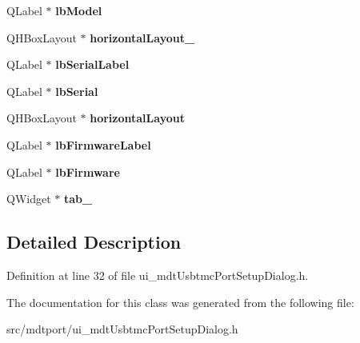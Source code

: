 \begin{DoxyCompactItemize}
\item 
\hypertarget{class_ui__mdt_usbtmc_port_setup_dialog_a4b232d8ec48cc104fc4d2eaaad355eaf}{
QLabel $\ast$ {\bfseries lbModel}}
\label{class_ui__mdt_usbtmc_port_setup_dialog_a4b232d8ec48cc104fc4d2eaaad355eaf}

\item 
\hypertarget{class_ui__mdt_usbtmc_port_setup_dialog_a1c30ffa4feabde91713d7a8c7a053fbc}{
QHBoxLayout $\ast$ {\bfseries horizontalLayout\_}}
\label{class_ui__mdt_usbtmc_port_setup_dialog_a1c30ffa4feabde91713d7a8c7a053fbc}

\item 
\hypertarget{class_ui__mdt_usbtmc_port_setup_dialog_a68f9749fc3e70be2ba7a965da14f067f}{
QLabel $\ast$ {\bfseries lbSerialLabel}}
\label{class_ui__mdt_usbtmc_port_setup_dialog_a68f9749fc3e70be2ba7a965da14f067f}

\item 
\hypertarget{class_ui__mdt_usbtmc_port_setup_dialog_ad899cb06224711efc6720c7a8126b1a3}{
QLabel $\ast$ {\bfseries lbSerial}}
\label{class_ui__mdt_usbtmc_port_setup_dialog_ad899cb06224711efc6720c7a8126b1a3}

\item 
\hypertarget{class_ui__mdt_usbtmc_port_setup_dialog_a1380888929c980b6af834911e1487cfc}{
QHBoxLayout $\ast$ {\bfseries horizontalLayout}}
\label{class_ui__mdt_usbtmc_port_setup_dialog_a1380888929c980b6af834911e1487cfc}

\item 
\hypertarget{class_ui__mdt_usbtmc_port_setup_dialog_afd0b324f810d7f248665ebf3974f4709}{
QLabel $\ast$ {\bfseries lbFirmwareLabel}}
\label{class_ui__mdt_usbtmc_port_setup_dialog_afd0b324f810d7f248665ebf3974f4709}

\item 
\hypertarget{class_ui__mdt_usbtmc_port_setup_dialog_a37252f1a39f7da58e5dcf12c34c5150b}{
QLabel $\ast$ {\bfseries lbFirmware}}
\label{class_ui__mdt_usbtmc_port_setup_dialog_a37252f1a39f7da58e5dcf12c34c5150b}

\item 
\hypertarget{class_ui__mdt_usbtmc_port_setup_dialog_aa12bb6a7f8450d0bbd1a6f0a64ede456}{
QWidget $\ast$ {\bfseries tab\_}}
\label{class_ui__mdt_usbtmc_port_setup_dialog_aa12bb6a7f8450d0bbd1a6f0a64ede456}

\end{DoxyCompactItemize}


\subsection{Detailed Description}


Definition at line 32 of file ui\_\-mdtUsbtmcPortSetupDialog.h.



The documentation for this class was generated from the following file:\begin{DoxyCompactItemize}
\item 
src/mdtport/ui\_\-mdtUsbtmcPortSetupDialog.h\end{DoxyCompactItemize}
